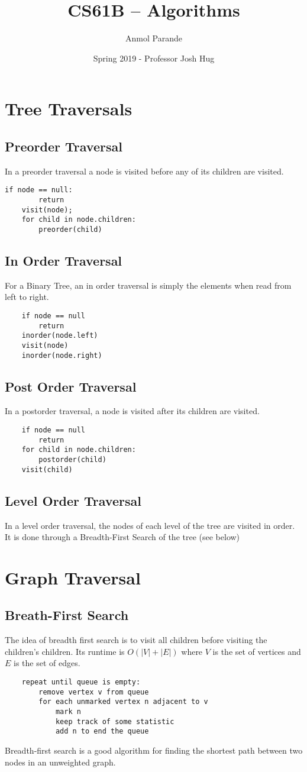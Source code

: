 \documentclass{article}
\begin{document}
    \title{CS61B -- Algorithms}
    \author{Anmol Parande}
    \date{Spring 2019 - Professor Josh Hug}
\maketitle
\tableofcontents
\section{Tree Traversals}
\subsection{Preorder Traversal}
In a preorder traversal a node is visited before any of its children are visited.
\begin{lstlisting}[]
    if node == null:
        return
    visit(node);
    for child in node.children:
        preorder(child)
\end{lstlisting}
\subsection{In Order Traversal}
For a Binary Tree, an in order traversal is simply the elements when read from left to right.
\begin{lstlisting}
    if node == null
        return
    inorder(node.left)
    visit(node)
    inorder(node.right)
\end{lstlisting}
\subsection{Post Order Traversal}
In a postorder traversal, a node is visited after its children are visited.
\begin{lstlisting}
    if node == null
        return
    for child in node.children:
        postorder(child)
    visit(child)
\end{lstlisting}
\subsection{Level Order Traversal}
In a level order traversal, the nodes of each level of the tree are visited in order.
It is done through a Breadth-First Search of the tree (see below)
\section{Graph Traversal}
\subsection{Breath-First Search}
The idea of breadth first search is to visit all children before visiting the children's children.
Its runtime is $O(|V|+|E|)$ where $V$ is the set of vertices and $E$ is the set of edges.
\begin{lstlisting}
    repeat until queue is empty:
        remove vertex v from queue
        for each unmarked vertex n adjacent to v
            mark n
            keep track of some statistic
            add n to end the queue
\end{lstlisting}
Breadth-first search is a good algorithm for finding the shortest path between two nodes in an unweighted graph.
\end{document}
